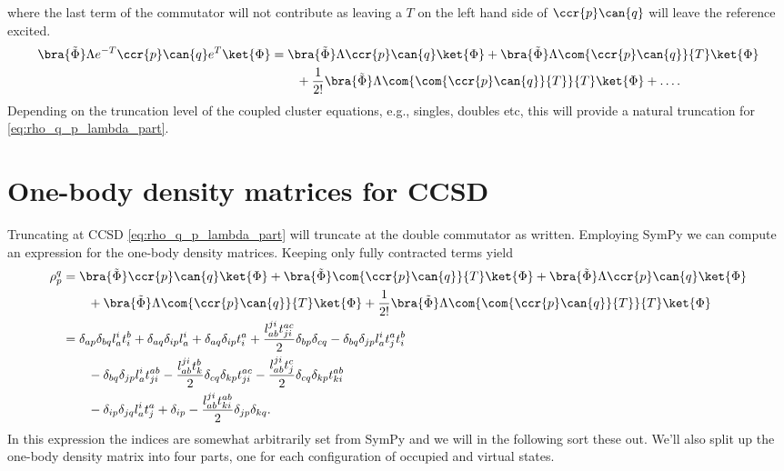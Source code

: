     where the last term of the commutator will not contribute as leaving a $T$
    on the left hand side of $\ccr{p}\can{q}$ will leave the reference excited.
    \begin{align}
        \bra{\tilde{\Phi}}\Lambda e^{-T}\ccr{p}\can{q}e^T\ket{\Phi}
        &= \bra{\tilde{\Phi}}\Lambda \ccr{p}\can{q}\ket{\Phi}
        + \bra{\tilde{\Phi}}\Lambda \com{\ccr{p}\can{q}}{T}\ket{\Phi}
        \nonumber \\
        &\qquad
        + \frac{1}{2!}
        \bra{\tilde{\Phi}}\Lambda \com{\com{\ccr{p}\can{q}}{T}}{T}\ket{\Phi}
        + \dots.
        \label{eq:rho_q_p_lambda_part}
    \end{align}
    Depending on the truncation level of the coupled cluster equations, e.g.,
    singles, doubles etc, this will provide a natural truncation for
    \autoref{eq:rho_q_p_lambda_part}.

    \section{One-body density matrices for CCSD}
        Truncating at CCSD \autoref{eq:rho_q_p_lambda_part} will truncate at the
        double commutator as written. Employing SymPy\cite{sympy} we can compute
        an expression for the one-body density matrices. Keeping only fully
        contracted terms yield
        \begin{align}
            \rho^{q}_{p}
            &= \bra{\tilde{\Phi}}\ccr{p}\can{q}\ket{\Phi}
            + \bra{\tilde{\Phi}}\com{\ccr{p}\can{q}}{T}\ket{\Phi}
            + \bra{\tilde{\Phi}}\Lambda \ccr{p}\can{q}\ket{\Phi}
            \nonumber \\
            &\qquad
            + \bra{\tilde{\Phi}}\Lambda \com{\ccr{p}\can{q}}{T}\ket{\Phi}
            + \frac{1}{2!}
            \bra{\tilde{\Phi}}\Lambda \com{\com{\ccr{p}\can{q}}{T}}{T}\ket{\Phi}
            \\
            &=
            \delta_{a p} \delta_{b q} l^{i}_{a} t^{b}_{i}
            + \delta_{a q} \delta_{i p} l^{i}_{a}
            + \delta_{a q} \delta_{i p} t^{a}_{i}
            + \frac{l^{ji}_{ab} t^{ac}_{ji}}{2} \delta_{b p} \delta_{c q}
            - \delta_{b q} \delta_{j p} l^{i}_{a} t^{a}_{j} t^{b}_{i}
            \nonumber \\
            &\qquad
            - \delta_{b q} \delta_{j p} l^{i}_{a} t^{ab}_{ji}
            - \frac{l^{ji}_{ab} t^{b}_{k}}{2} \delta_{c q} \delta_{k p} t^{ac}_{ji}
            - \frac{l^{ji}_{ab} t^{c}_{j}}{2} \delta_{c q} \delta_{k p} t^{ab}_{ki}
            \nonumber \\
            &\qquad
            - \delta_{i p} \delta_{j q} l^{i}_{a} t^{a}_{j}
            + \delta_{i p}
            - \frac{l^{ji}_{ab} t^{ab}_{ki}}{2} \delta_{j p} \delta_{k q}.
        \end{align}
        In this expression the indices are somewhat arbitrarily set from SymPy
        and we will in the following sort these out. We'll also split up the
        one-body density matrix into four parts, one for each configuration of
        occupied and virtual states.
